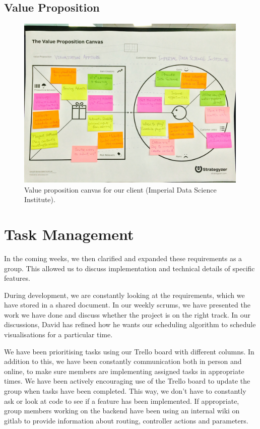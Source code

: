 \documentclass[a4paper]{article}
\begin{document}
\subsection{Value Proposition}
\begin{figure}[H]
   \begin{center}
      \includegraphics[width = 0.99\textwidth, trim = 1cm 6.5cm 1cm 4.5cm, clip]{./evaluation/value_prop_canvas.jpg}
   \end{center}
   \caption{Value proposition canvas for our client (Imperial Data
            Science Institute).}
   \label{fig:valpropcanvas}
\end{figure}



\section{Task Management}
In the coming weeks, we then clarified and expanded these requirements as 
a group. This allowed us to discuss implementation and technical details
of specific features.


During development, we are constantly looking at the requirements, which 
we have stored in a shared document. In our weekly scrums, we have 
presented the work we have done and discuss whether the project is on the 
right track. In our discussions, David has refined how he wants our
scheduling algorithm to schedule visualisations for a particular time. 



We have been prioritising tasks using our Trello board with different
columns. In addition to this, we have been constantly communication both 
in person and online, to make sure members are implementing assigned tasks
in appropriate times. We have been actively encouraging use of the Trello 
board to update the group when tasks have been completed. This way, 
we don't have to constantly ask or look at code to see if a feature has 
been implemented. If appropriate, group members working on the backend
have been using an internal wiki on gitlab to provide information about
routing, controller actions and parameters. 
\end{document}
